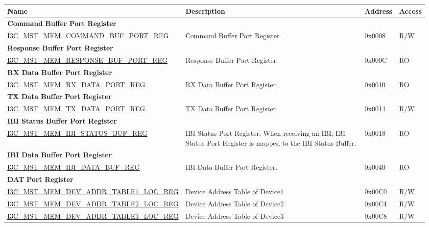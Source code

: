 \begin{longtable}{ | p{8cm} | p{5.5cm} | p{1.3cm} | p{1cm} | }
\hline\rowcolor{lightgray}
\textbf{Name} & \textbf{Description} &  \textbf{Address} & \textbf{Access} \\ \hline
\endhead
\multicolumn{4}{|l|}{\textbf{Command Buffer Port Register}} \\ \hline
\hyperref[regdesc:I3CMSTMEMCOMMANDBUFPORTREG]{I3C\_MST\_MEM\_COMMAND\_BUF\_PORT\_REG} & Command Buffer Port Register & 0x0008 & R/W \\ \hline
\multicolumn{4}{|l|}{\textbf{Response Buffer Port Register}} \\ \hline
\hyperref[regdesc:I3CMSTMEMRESPONSEBUFPORTREG]{I3C\_MST\_MEM\_RESPONSE\_BUF\_PORT\_REG} & Response Buffer Port Register & 0x000C & RO \\ \hline
\multicolumn{4}{|l|}{\textbf{RX Data Buffer Port Register}} \\ \hline
\hyperref[regdesc:I3CMSTMEMRXDATAPORTREG]{I3C\_MST\_MEM\_RX\_DATA\_PORT\_REG} & RX Data Buffer Port Register & 0x0010 & RO \\ \hline
\multicolumn{4}{|l|}{\textbf{TX Data Buffer Port Register}} \\ \hline
\hyperref[regdesc:I3CMSTMEMTXDATAPORTREG]{I3C\_MST\_MEM\_TX\_DATA\_PORT\_REG} & TX Data Buffer Port Register & 0x0014 & R/W \\ \hline
\multicolumn{4}{|l|}{\textbf{IBI Status Buffer Port Register}} \\ \hline
\hyperref[regdesc:I3CMSTMEMIBISTATUSBUFREG]{I3C\_MST\_MEM\_IBI\_STATUS\_BUF\_REG} & IBI Status Port Register. When receiving an IBI, IBI Status Port Register is mapped to the IBI Status Buffer. & 0x0018 & RO \\ \hline
\multicolumn{4}{|l|}{\textbf{IBI Data Buffer Port Register}} \\ \hline
\hyperref[regdesc:I3CMSTMEMIBIDATABUFREG]{I3C\_MST\_MEM\_IBI\_DATA\_BUF\_REG} & IBI Data Buffer Port Register. & 0x0040 & RO \\ \hline
\multicolumn{4}{|l|}{\textbf{DAT Port Register}} \\ \hline
\hyperref[regdesc:I3CMSTMEMDEVADDRTABLENLOCREG]{I3C\_MST\_MEM\_DEV\_ADDR\_TABLE1\_LOC\_REG} & Device Address Table of Device1 & 0x00C0 & R/W \\ \hline
\hyperref[regdesc:I3CMSTMEMDEVADDRTABLENLOCREG]{I3C\_MST\_MEM\_DEV\_ADDR\_TABLE2\_LOC\_REG} & Device Address Table of Device2 & 0x00C4 & R/W \\ \hline
\hyperref[regdesc:I3CMSTMEMDEVADDRTABLENLOCREG]{I3C\_MST\_MEM\_DEV\_ADDR\_TABLE3\_LOC\_REG} & Device Address Table of Device3 & 0x00C8 & R/W \\ \hline

\end{longtable}
